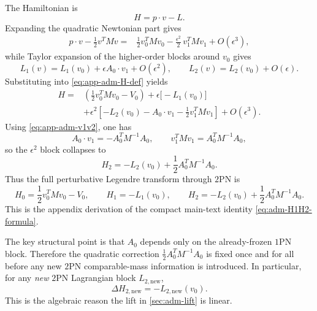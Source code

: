 \documentclass[11pt]{article}
\newcommand{\OnePN}{\mathrm{1PN}}
\newcommand{\TwoPN}{\mathrm{2PN}}
\begin{document}
The Hamiltonian is
\begin{equation}
H=p\cdot v-L.
\label{eq:app-adm-H-def}
\end{equation}
Expanding the quadratic Newtonian part gives
\begin{align}
p\cdot v-\frac12 v^T M v
={}&
\frac12 v_0^T M v_0
-\frac{\epsilon^2}{2}\,v_1^T M v_1
+O(\epsilon^3),
\label{eq:app-adm-quadratic-piece}
\end{align}
while Taylor expansion of the higher-order blocks around \(v_0\) gives
\begin{equation}
L_1(v)=L_1(v_0)+\epsilon A_0\cdot v_1+O(\epsilon^2),
\qquad
L_2(v)=L_2(v_0)+O(\epsilon).
\label{eq:app-adm-L1L2-taylor}
\end{equation}
Substituting into \cref{eq:app-adm-H-def} yields
\begin{align}
H
={}&
\left(\frac12 v_0^T M v_0-V_0\right)
+\epsilon\bigl[-L_1(v_0)\bigr]
\nonumber\\
&+\epsilon^2\left[-L_2(v_0)-A_0\cdot v_1-\frac12 v_1^T M v_1\right]
+O(\epsilon^3).
\label{eq:app-adm-H-preliminary}
\end{align}
Using \cref{eq:app-adm-v1v2}, one has
\begin{equation}
A_0\cdot v_1=-A_0^T M^{-1}A_0,
\qquad
v_1^T M v_1=A_0^T M^{-1}A_0,
\label{eq:app-adm-v1-contractions}
\end{equation}
so the \(\epsilon^2\) block collapses to
\begin{equation}
H_2=-L_2(v_0)+\frac12 A_0^T M^{-1}A_0.
\label{eq:app-adm-H2-derived}
\end{equation}
Thus the full perturbative Legendre transform through \(\TwoPN\) is
\begin{equation}
H_0=\frac12 v_0^T M v_0-V_0,
\qquad
H_1=-L_1(v_0),
\qquad
H_2=-L_2(v_0)+\frac12 A_0^T M^{-1}A_0.
\label{eq:app-adm-H0H1H2}
\end{equation}
This is the appendix derivation of the compact main-text identity
\cref{eq:adm-H1H2-formula}.

The key structural point is that \(A_0\) depends only on the already-frozen
\(\OnePN\) block.  Therefore the quadratic correction
\(\frac12 A_0^T M^{-1}A_0\) is fixed once and for all before any new \(\TwoPN\)
comparable-mass information is introduced.  In particular, for any 
\emph{new} \(\TwoPN\) Lagrangian block \(L_{2,\mathrm{new}}\),
\begin{equation}
\Delta H_{2,\mathrm{new}}=-L_{2,\mathrm{new}}(v_0).
\label{eq:app-adm-linear-new-block}
\end{equation}
This is the algebraic reason the lift in \cref{sec:adm-lift} is linear.
\end{document}
